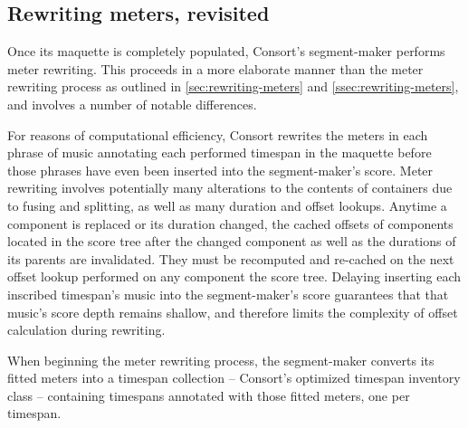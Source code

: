 \subsection{Rewriting meters, revisited}
\label{ssec:rewriting-meters-revisited}

Once its maquette is completely populated, Consort's segment-maker performs
meter rewriting. This proceeds in a more elaborate manner than the meter
rewriting process as outlined in \autoref{sec:rewriting-meters} and
\autoref{ssec:rewriting-meters}, and involves a number of notable differences.

For reasons of computational efficiency, Consort rewrites the meters in
each phrase of music annotating each performed timespan in the maquette before
those phrases have even been inserted into the segment-maker's score. Meter
rewriting involves potentially many alterations to the contents of containers
due to fusing and splitting, as well as many duration and offset lookups.
Anytime a component is replaced or its duration changed, the cached offsets of
components located in the score tree after the changed component as well as
the durations of its parents are invalidated. They must be recomputed and
re-cached on the next offset lookup performed on any component the score tree.
Delaying inserting each inscribed timespan's music into the segment-maker's
score guarantees that that music's score depth remains shallow, and therefore
limits the complexity of offset calculation during rewriting.

When beginning the meter rewriting process, the segment-maker converts its
fitted meters into a timespan collection -- Consort's optimized timespan
inventory class -- containing timespans annotated with those fitted meters, one
per timespan.

\begin{comment}
<abjad>
meters = metertools.MeterInventory([(3, 4), (2, 4), (6, 8), (5, 16)])
meter_timespans = consort.SegmentMaker.meters_to_timespans(meters)
print(format(meter_timespans))
</abjad>
\end{comment}


